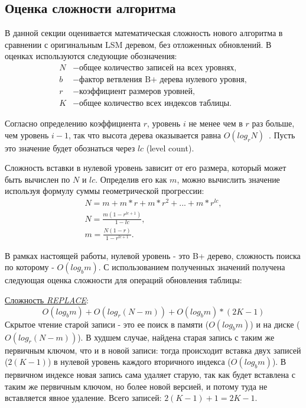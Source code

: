 \documentclass[a4paper,hidelinks,12pt]{article}
\begin{document}
\subsection{Оценка сложности алгоритма}
В данной секции оценивается математическая сложность нового алгоритма в
сравнении с оригинальным LSM деревом, без отложенных обновлений. В оценках
используются следующие обозначения:
\begin{align*}
N &- \text{общее количество записей на всех уровнях}, \\
b &- \text{фактор ветвления B+ дерева нулевого уровня}, \\
r &- \text{коэффициент размеров уровней}, \\
K &- \text{общее количество всех индексов таблицы}.
\end{align*}

Согласно определению коэффициента $r$, уровень $i$ не менее чем в $r$ раз
больше, чем уровень $i - 1$, так что высота дерева оказывается равна
$O(log_rN)$~\cite{slimdb}. Пусть это значение будет обознаться через $lc$
(level count).

Сложность вставки в нулевой уровень зависит от его размера, который может быть
вычислен по $N$ и $lc$. Определив его как $m$, можно вычислить значение
используя формулу суммы геометрической прогрессии:
\begin{gather*}
N = m + m*r + m*r^2 + ... + m*r^{lc}, \\
N = \frac{m(1 - r^{lc+1})}{1 - lc}, \\
m = \frac{N(1 - r)}{1 - r^{lc + 1}}.
\end{gather*}

В рамках настоящей работы, нулевой уровень - это B+ дерево, сложность поиска по
которому - $O(log_bm)$. С использованием полученных значений получена следующая
оценка сложности для операций обновления таблицы:

\underline{Сложность \textit{REPLACE}}:
\begin{displaymath}
O(log_bm) + O(log_r(N - m)) + O(log_bm) * (2K - 1)
\end{displaymath}
Скрытое чтение старой записи - это ее поиск в памяти ($O(log_bm)$) и на диске
($O(log_r(N - m))$). В худшем случае, найдена старая запись с таким же первичным
ключом, что и в новой записи: тогда происходит вставка двух записей ($2(K - 1)$)
в нулевой уровень каждого вторичного индекса ($O(log_bm)$). В первичном индексе
новая запись сама удаляет старую, так как будет вставлена с таким же первичным
ключом, но более новой версией, и потому туда не вставляется явное удаление.
Всего записей: $2(K - 1) + 1 = 2K - 1$.
\end{document}
